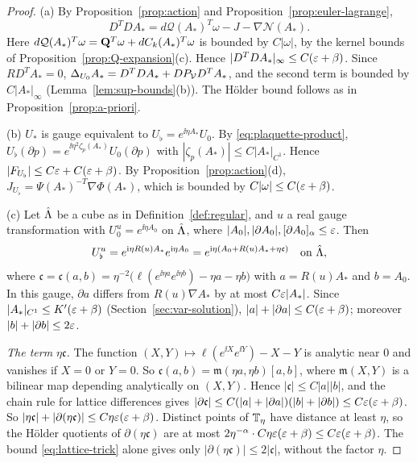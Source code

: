 \begin{proof}
(a) By Proposition~\ref{prop:action} and Proposition~\ref{prop:euler-lagrange},
\[
D^TDA_*=d\mathcal Q(A_*)^T\omega-J-\nabla\mathcal N(A_*).
\]
Here $d\mathcal Q(A_*)^T\omega=\mathbf Q^T\omega+dC_k(A_*)^T\omega$ is bounded by $C|\omega|$, by the kernel bounds of Proposition~\ref{prop:Q-expansion}(c). Hence $|D^TDA_*|_\infty\le C(\varepsilon+\beta)$. Since $RD^TA_*=0$, $\Delta_{U_0}A_*=D^TDA_*+DP_\mathcal V D^TA_*$, and the second term is bounded by $C|A_*|_\infty$ (Lemma~\ref{lem:sup-bounds}(b)). The H\"older bound follows as in Proposition~\ref{prop:a-priori}.

(b) $U_*$ is gauge equivalent to $U_\flat=e^{\ii\eta A_*}U_0$. By \eqref{eq:plaquette-product}, $U_\flat(\partial p)=e^{\ii\eta^2\zeta_p(A_*)}U_0(\partial p)$ with $|\zeta_p(A_*)|\le C|A_*|_{C^1}$. Hence $|F_{U_\flat}|\le C\varepsilon+C(\varepsilon+\beta)$. By Proposition~\ref{prop:action}(d), $J_{U_\flat}=\Psi(A_*)^{-T}\nabla\Phi(A_*)$, which is bounded by $C|\omega|\le C(\varepsilon+\beta)$.

(c) Let $\hat{\Lambda}$ be a cube as in Definition~\ref{def:regular}, and $u$ a real gauge transformation with $U_0^u=e^{\ii\eta A_0}$ on $\hat{\Lambda}$, where $|A_0|,|\partial A_0|,[\partial A_0]_\alpha\le\varepsilon$. Then
\[
U_\flat^u=e^{\mathrm i\eta R(u)A_*}e^{\mathrm i\eta A_0}=e^{\mathrm i\eta(A_0+R(u)A_*+\eta\mathfrak c)}\quad\text{on }\hat{\Lambda},
\]
where $\mathfrak c=\mathfrak c(a,b)=\eta^{-2}\big(\ell(e^{\ii\eta a}e^{\ii\eta b})-\eta a-\eta b\big)$ with $a=R(u)A_*$ and $b=A_0$. In this gauge, $\partial a$ differs from $R(u)\nabla A_*$ by at most $C\varepsilon|A_*|$. Since $|A_*|_{C^1}\le K'(\varepsilon+\beta)$ (Section~\ref{sec:var-solution}), $|a|+|\partial a|\le C(\varepsilon+\beta)$; moreover $|b|+|\partial b|\le2\varepsilon$.

\emph{The term $\eta\mathfrak c$.} The function $(X,Y)\mapsto\ell(e^{\ii X}e^{\ii Y})-X-Y$ is analytic near $0$ and vanishes if $X=0$ or $Y=0$. So $\mathfrak c(a,b)=\mathfrak m(\eta a,\eta b)[a,b]$, where $\mathfrak m(X,Y)$ is a bilinear map depending analytically on $(X,Y)$. Hence $|\mathfrak c|\le C|a||b|$, and the chain rule for lattice differences gives $|\partial\mathfrak c|\le C(|a|+|\partial a|)(|b|+|\partial b|)\le C\varepsilon(\varepsilon+\beta)$. So $|\eta\mathfrak c|+|\partial(\eta\mathfrak c)|\le C\eta\varepsilon(\varepsilon+\beta)$. Distinct points of $\mathbb T_\eta$ have distance at least $\eta$, so the H\"older quotients of $\partial(\eta\mathfrak c)$ are at most $2\eta^{-\alpha}\cdot C\eta\varepsilon(\varepsilon+\beta)\le C\varepsilon(\varepsilon+\beta)$. The bound \eqref{eq:lattice-trick} alone gives only $|\partial(\eta\mathfrak c)|\le2|\mathfrak c|$, without the factor $\eta$.


\end{proof}

